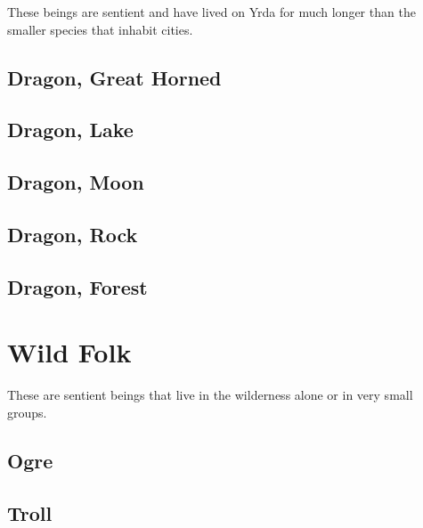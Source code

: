 \begin{multicols}{2}
These beings are sentient and have lived on Yrda for much
longer than the smaller species that inhabit cities.

\subsection{Dragon, Great Horned}

\subsection{Dragon, Lake}

\subsection{Dragon, Moon}

\subsection{Dragon, Rock}

\subsection{Dragon, Forest}

\section{Wild Folk}

These are sentient beings that live in the wilderness alone or
in very small groups.

\subsection{Ogre}

\subsection{Troll}

\end{multicols}
